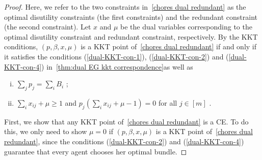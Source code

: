 \documentclass[format=acmsmall,authorversion]{acmart}
\newcommand{\cD}{\mathcal{D}}
\begin{document}
\begin{proof}
    Here, we refer to the two constraints in~\ref{chores dual redundant} as the optimal disutility constraints (the first constraints) and the redundant constraint (the second constraint). 
    Let $x$ and $\mu$ be the dual variables corresponding to the optimal disutility constraint and redundant constraint, respectively. 
    By the KKT conditions, $(p, \beta, x, \mu)$ is a KKT point of~\ref{chores dual redundant} if and only if it satisfies the conditions (\cref{dual-KKT-con-1}), (\cref{dual-KKT-con-2}) and (\cref{dual-KKT-con-4}) in~\cref{thm:dual EG kkt correspondence}as well as 
    \begin{enumerate}[(i)]
        \item $\sum_j p_j = \sum_i B_i$ %
        \label{dual-redundant-KKT-con-2}; 
        \item $\sum_i x_{ij} + \mu \geq 1$ and $p_j \left( \sum_i x_{ij} + \mu - 1 \right) = 0$ for all $j \in [m]$ \label{dual-redundant-KKT-con-3}.
    \end{enumerate}
    First, we show that any KKT point of~\ref{chores dual redundant} is a CE. 
    To do this, we only need to show $\mu = 0$ if $(p, \beta, x, \mu)$ is a KKT point of~\ref{chores dual redundant}, 
    since the conditions (\cref{dual-KKT-con-2}) and (\cref{dual-KKT-con-4}) guarantee that every agent chooses her optimal bundle.  

    


\end{proof}
\end{document}
